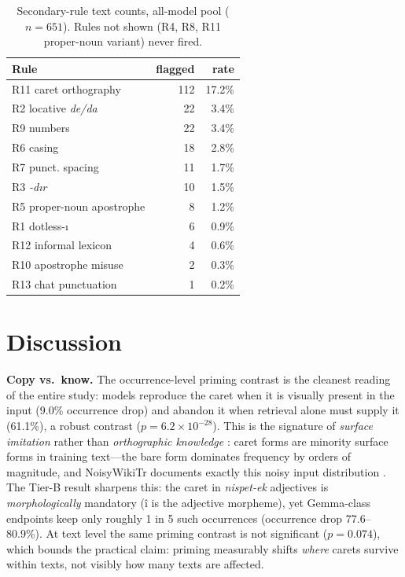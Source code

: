 \documentclass[11pt]{article}
\begin{document}
\begin{table}[t]
\centering
\small
\begin{tabular}{lrr}
\toprule
Rule & flagged & rate \\
\midrule
R11 caret orthography & 112 & 17.2\% \\
R2 locative \emph{de/da} & 22 & 3.4\% \\
R9 numbers & 22 & 3.4\% \\
R6 casing & 18 & 2.8\% \\
R7 punct. spacing & 11 & 1.7\% \\
R3 \emph{-d{\i}r} & 10 & 1.5\% \\
R5 proper-noun apostrophe & 8 & 1.2\% \\
R1 dotless-\i & 6 & 0.9\% \\
R12 informal lexicon & 4 & 0.6\% \\
R10 apostrophe misuse & 2 & 0.3\% \\
R13 chat punctuation & 1 & 0.2\% \\
\bottomrule
\end{tabular}
\caption{Secondary-rule text counts, all-model pool ($n{=}651$). Rules not shown (R4, R8, R11 proper-noun variant) never fired.}
\label{tab:rules}
\end{table}

\section{Discussion}

\textbf{Copy vs.\ know.} The occurrence-level priming contrast is the cleanest reading of the entire study: models reproduce the caret when it is visually present in the input (9.0\% occurrence drop) and abandon it when retrieval alone must supply it (61.1\%), a robust contrast ($p{=}6.2\times10^{-28}$). This is the signature of \emph{surface imitation} rather than \emph{orthographic knowledge} \cite{magikarp2024}: caret forms are minority surface forms in training text---the bare form dominates frequency by orders of magnitude, and NoisyWikiTr documents exactly this noisy input distribution \cite{noisywiki2025}. The Tier-B result sharpens this: the caret in \emph{nispet-ek} adjectives is \emph{morphologically} mandatory ({\^i} is the adjective morpheme), yet Gemma-class endpoints keep only roughly 1 in 5 such occurrences (occurrence drop 77.6--80.9\%). At text level the same priming contrast is not significant ($p{=}0.074$), which bounds the practical claim: priming measurably shifts \emph{where} carets survive within texts, not visibly how many texts are affected.
\end{document}

